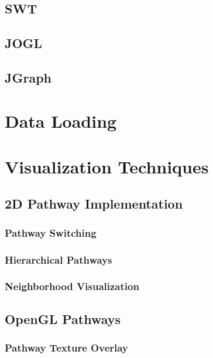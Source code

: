 \subsection{SWT}


\subsection{JOGL}


\subsection{JGraph}

\section{Data Loading}

\section{Visualization Techniques}

\subsection{2D Pathway Implementation}
\subsubsection{Pathway Switching}
\subsubsection{Hierarchical Pathways}
\subsubsection{Neighborhood Visualization}

\subsection{OpenGL Pathways}
\subsubsection{Pathway Texture Overlay}
